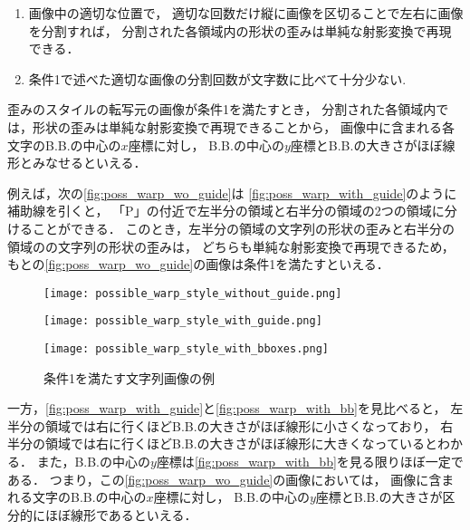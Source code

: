 \documentclass[\homedir/main.tex]{subfiles}
\begin{document}
\begin{enumerate}[label=\textbf{条件\arabic*:}]
    \item 画像中の適切な位置で，
          適切な回数だけ縦に画像を区切ることで左右に画像を分割すれば，
          分割された各領域内の形状の歪みは単純な射影変換で再現できる．
    \item 条件1で述べた適切な画像の分割回数が文字数に比べて十分少ない.
\end{enumerate}

歪みのスタイルの転写元の画像が条件1を満たすとき，
分割された各領域内では，形状の歪みは単純な射影変換で再現できることから，
画像中に含まれる各文字のB.B.の中心の$x$座標に対し，
B.B.の中心の$y$座標とB.B.の大きさがほぼ線形とみなせるといえる．

例えば，次の\cref{fig:poss_warp_wo_guide}は
\cref{fig:poss_warp_with_guide}のように補助線を引くと，
「P」の付近で左半分の領域と右半分の領域の2つの領域に分けることができる．
このとき，左半分の領域の文字列の形状の歪みと右半分の領域のの文字列の形状の歪みは，
どちらも単純な射影変換で再現できるため，
もとの\cref{fig:poss_warp_wo_guide}の画像は条件1を満たすといえる．
\begin{figure}[h]
    \centering
    \begin{minipage}[b]{0.45\linewidth}
        \centering
        \texttt{[image: possible\_warp\_style\_without\_guide.png]}
        \label{fig:poss_warp_wo_guide}
    \end{minipage}
    \begin{minipage}[b]{0.45\linewidth}
        \centering
        \texttt{[image: possible\_warp\_style\_with\_guide.png]}
        \label{fig:poss_warp_with_guide}
    \end{minipage}
    \begin{minipage}[b]{0.45\linewidth}
        \centering
        \texttt{[image: possible\_warp\_style\_with\_bboxes.png]}
        \label{fig:poss_warp_with_bb}
    \end{minipage}
    \caption{条件1を満たす文字列画像の例}
    \label{fig:possible_warp_style}
\end{figure}
\newpage
一方，\cref{fig:poss_warp_with_guide}と\cref{fig:poss_warp_with_bb}を見比べると，
左半分の領域では右に行くほどB.B.の大きさがほぼ線形に小さくなっており，
右半分の領域では右に行くほどB.B.の大きさがほぼ線形に大きくなっているとわかる．
また，B.B.の中心の$y$座標は\cref{fig:poss_warp_with_bb}を見る限りほぼ一定である．
つまり，この\cref{fig:poss_warp_wo_guide}の画像においては，
画像に含まれる文字のB.B.の中心の$x$座標に対し，
B.B.の中心の$y$座標とB.B.の大きさが区分的にほぼ線形であるといえる．
\end{document}
